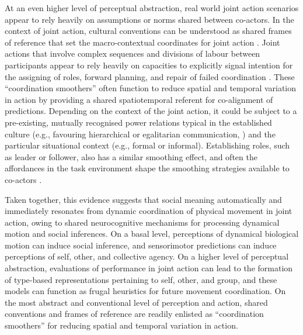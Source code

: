 \begin{CJK}{UTF8}{gbsn}
At an even higher level of perceptual abstraction, real world joint action scenarios appear to rely heavily on assumptions or norms shared between co-actors.  In the context of joint action, cultural conventions can be understood as shared frames of reference that set the macro-contextual coordinates for joint action \citep{Clark2013}. Joint actions that involve complex sequences and divisions of labour between participants appear to rely heavily on capacities to explicitly signal intention for the assigning of roles, forward planning, and repair of failed coordination \citep{Frith2010}.  These ``coordination smoothers'' \citep{Vesper2017} often function to reduce spatial and temporal variation in action by providing a shared spatiotemporal referent for co-alignment of predictions.  Depending on the context of the joint action, it could be subject to a pre-existing, mutually recognised power relations typical in the established culture (e.g., favouring hierarchical or egalitarian communication, \citep[see]{Cheon2011}) and the particular situational context (e.g., formal or informal).  Establishing roles, such as leader or follower, also has a similar smoothing effect, and often the affordances in the task environment shape the smoothing strategies available to co-actors \citep{Marsh2009}.

Taken together, this evidence suggests that social meaning automatically and immediately resonates from dynamic coordination of physical movement in joint action, owing to shared neurocognitive mechanisms for processing dynamical motion and social inferences.  On a basal level, perceptions of dynamical biological motion can induce social inference, and sensorimotor predictions can induce perceptions of self, other, and collective agency.  On a higher level of perceptual abstraction, evaluations of performance in joint action can lead to the formation of type-based representations pertaining to self, other, and group, and these models can function as frugal heuristics for future movement coordination.  On the most abstract and conventional level of perception and action, shared conventions and frames of reference are readily enlisted as ``coordination smoothers'' for reducing spatial and temporal variation in action.











\end{CJK}
